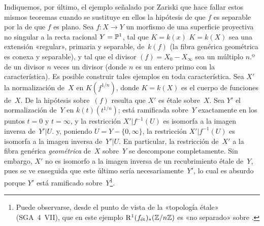 Indiquemos, por último, el ejemplo señalado por Zariski que hace fallar
estos mismos teoremas cuando se sustituye en ellos la hipótesis de que $f$
es separable por la de que $f$ es plano. Sea $f\colon X\to Y$ un morfismo
de una superficie proyectiva no singular a la recta racional $Y=\mathbb P^1$,
tal que
{$K=k(x)$}
{$K=k(X)$}
sea una extensión «regular», \ie primaria y separable, de~$k(f)$ (\ie la
fibra genérica geométrica es conexa y separable), y tal que el divisor
$(f)=X_0-X_\infty$ sea
{un múltiplo $n$.º de un divisor}
{$n$ veces un divisor}
(donde $n$ es un entero primo con la característica). Es posible construir
tales ejemplos en toda característica. Sea $X'$ la normalización de~$X$ en
$K(f^{1/n})$, donde $K=k(X)$ es el cuerpo de funciones de~$X$. De la
hipótesis sobre~$(f)$ resulta que $X'$ es étale sobre~$X$. Sea $Y'$ el
normalización de~$Y$ en $k(t)(t^{1/n})$; está ramificada sobre~$Y$ exactamente
en los puntos $t=0$ y $t=\infty$,
{y la restricción $X'|f^{-1}(U)$ es isomorfa a la imagen inversa de~$Y'|U$.}
{y, poniendo $U=Y-\{0,\infty\}$, la restricción $X'|f^{-1}(U)$ es isomorfa a la imagen inversa de~$Y'|U$.}
En particular, la restricción de~$X'$ a la fibra genérica \emph{geométrica}
de~$X$ sobre~$Y$ se descompone completamente. Sin embargo, $X'$ no es
isomorfo a la imagen inversa de un recubrimiento étale de~$Y$, pues se ve
enseguida que este último sería necesariamente~$Y'$, lo cual es absurdo
porque $Y'$ está ramificado sobre~$Y$\kern2pt\footnote{Puede observarse,
desde el punto de vista de la «topología étale» (SGA~4~VII), que en este
ejemplo $\mathrm{R}^1(f_{\mathrm{\acute{e}t}})_*(\mathbb Z/n\mathbb Z)$ es «no separado» sobre
.
}.

